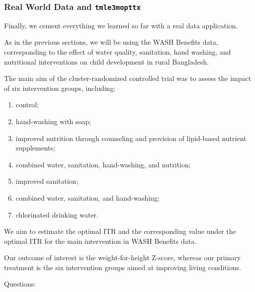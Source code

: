 \documentclass[12pt, krantz2,]{krantz}
\theoremstyle{definition}
\theoremstyle{definition}
\theoremstyle{definition}
\newcommand{\1}{\mathbbm{1}}
\begin{document}
\hypertarget{real-world-data-and-tmle3mopttx}{%
\subsubsection{\texorpdfstring{Real World Data and \texttt{tmle3mopttx}}{Real World Data and tmle3mopttx}}\label{real-world-data-and-tmle3mopttx}}

Finally, we cement everything we learned so far with a real data application.

As in the previous sections, we will be using the WASH Benefits data,
corresponding to the effect of water quality, sanitation, hand washing, and
nutritional interventions on child development in rural Bangladesh.

The main aim of the cluster-randomized controlled trial was to assess the
impact of six intervention groups, including:

\begin{enumerate}
\def\labelenumi{\arabic{enumi}.}
\item
  control;
\item
  hand-washing with soap;
\item
  improved nutrition through counseling and provision of lipid-based nutrient
  supplements;
\item
  combined water, sanitation, hand-washing, and nutrition;
\item
  improved sanitation;
\item
  combined water, sanitation, and hand-washing;
\item
  chlorinated drinking water.
\end{enumerate}

We aim to estimate the optimal ITR and the corresponding value under the optimal
ITR for the main intervention in WASH Benefits data.

Our outcome of interest is the weight-for-height Z-score, whereas our primary
treatment is the six intervention groups aimed at improving living conditions.

Questions:
\end{document}
